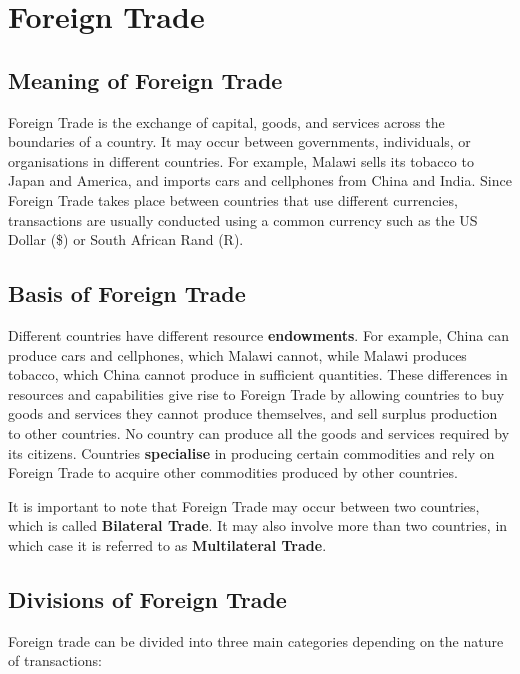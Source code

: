\documentclass[12pt,a4paper, openany]{book}
\begin{document}
\section{Foreign Trade}

\subsection{Meaning of Foreign Trade}
Foreign Trade is the exchange of capital, goods, and services across the boundaries of a country.
It may occur between governments, individuals, or organisations in different countries.
For example, Malawi sells its tobacco to Japan and America, and imports cars and cellphones from China and India.
Since Foreign Trade takes place between countries that use different currencies, transactions are usually conducted using a common currency such as the US Dollar (\$) or South African Rand (R).

\subsection{Basis of Foreign Trade}
Different countries have different resource \textbf{endowments}.
For example, China can produce cars and cellphones, which Malawi cannot, while Malawi produces tobacco, which China cannot produce in sufficient quantities.
These differences in resources and capabilities give rise to Foreign Trade by allowing countries to buy goods and services they cannot produce themselves, and sell surplus production to other countries.
No country can produce all the goods and services required by its citizens.
Countries \textbf{specialise} in producing certain commodities and rely on Foreign Trade to acquire other commodities produced by other countries.

\vspace{0.5cm}

It is important to note that Foreign Trade may occur between two countries, which is called \textbf{Bilateral Trade}.
It may also involve more than two countries, in which case it is referred to as \textbf{Multilateral Trade}.

\subsection{Divisions of Foreign Trade}
Foreign trade can be divided into three main categories depending on the nature of transactions:
\end{document}

